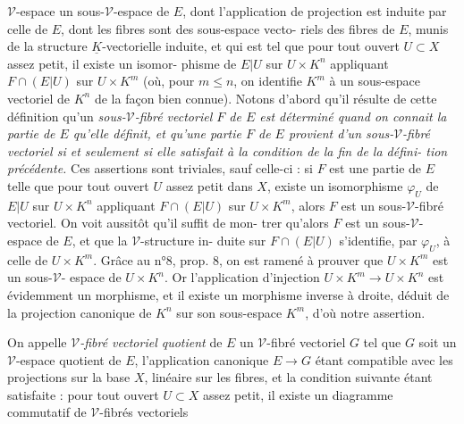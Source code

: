 $\mathcal{V}$-espace un sous-$\mathcal{V}$-espace de $E$, dont l'application de projection
est induite par celle de $E$, dont les fibres sont des sous-espace vecto-
riels des fibres de $E$, munis de la structure $\underline{K}$-vectorielle induite, et
qui est tel que pour tout ouvert $U \subset X$ assez petit, il existe un isomor-
phisme de $E|U$ sur $U \times K^n$ appliquant $F \cap (E|U)$ sur $U \times K^m$ (où, pour $m \le n$, on
identifie $K^m$ à un sous-espace vectoriel de $K^n$ de la façon bien connue).
Notons d'abord qu'il résulte de cette définition qu'un \emph{sous-$\mathcal{V}$-fibré
vectoriel $F$ de $E$ est déterminé quand on connait la partie de $E$ qu'elle
définit, et qu'une partie $F$ de $E$ provient d'un sous-$\mathcal{V}$-fibré vectoriel
si et seulement si elle satisfait à la condition de la fin de la défini-
tion précédente.} Ces assertions sont triviales, sauf celle-ci : si $F$ est
une partie de $E$ telle que pour tout ouvert $U$ assez petit dans $X$, existe
un isomorphisme $\varphi_U$ de $E|U$ sur $U \times K^n$ appliquant $F \cap (E|U)$ sur $U \times K^m$, alors
$F$ est un sous-$\mathcal{V}$-fibré vectoriel. On voit aussitôt qu'il suffit de mon-
trer qu'alors $F$ est un sous-$\mathcal{V}$-espace de $E$, et que la $\mathcal{V}$-structure in-
duite sur $F \cap (E|U)$ s'identifie, par $\varphi_U$, à celle de $U \times K^m$.
Grâce au n°8, prop. 8, on est ramené à prouver que $U \times K^m$ est un sous-$\mathcal{V}$-
espace de $U \times K^n$. Or l'application d'injection $U \times K^m \to U \times K^n$ est évidemment
un morphisme, et il existe un morphisme inverse à droite, déduit de la
projection canonique de $K^n$ sur son sous-espace $K^m$, d'où notre assertion.

On appelle \emph{$\mathcal{V}$-fibré vectoriel quotient} de $E$ un $\mathcal{V}$-fibré vectoriel $G$
tel que $G$ soit un $\mathcal{V}$-espace quotient de $E$, l'application canonique $E \to G$
étant compatible avec les projections sur la base $X$, linéaire sur les
fibres, et la condition suivante étant satisfaite : pour tout ouvert $U \subset X$
assez petit, il existe un diagramme commutatif de $\mathcal{V}$-fibrés vectoriels


\newpage


